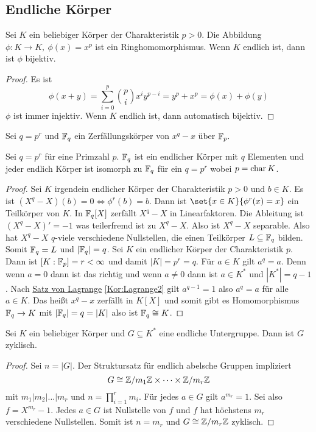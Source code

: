 \subsection{Endliche Körper}
\begin{Lemma}
    Sei $K$ ein beliebiger Körper der Charakteristik $p>0$. Die Abbildung $\phi\colon K\to K,\ \phi(x)=x^p$ ist ein Ringhomomorphismus. Wenn $K$ endlich ist, dann ist $\phi$ bijektiv.
\end{Lemma}
\begin{proof}
    Es ist $$\phi(x+y)=\sum_{i=0}^p\binom{p}{i}x^iy^{p-i}=y^p+x^p=\phi(x)+\phi(y)$$
    $\phi$ ist immer injektiv. Wenn $K$ endlich ist, dann automatisch bijektiv.
\end{proof}
\begin{Def}
    Sei $q=p^r$ und $\mathbb{F}_q$ ein Zerfällungskörper von $x^q-x$ über $\mathbb{F}_p.$
\end{Def}
\begin{Satz} Sei $q=p^r$ für eine Primzahl $p$.
    $\mathbb{F}_q$ ist ein endlicher Körper mit $q$ Elementen und jeder endlich Körper ist isomorph zu $\mathbb{F}_q$ für ein $q=p^r$ wobei $p=\operatorname{char} K$.
\end{Satz}
\begin{proof}
    Sei $K$ irgendein endlicher Körper der Charakteristik $p>0$ und $b\in K$. Es ist $(X^q-X)(b)=0\iff \phi^r(b)=b$. Dann ist $\set{x\in K}{ \phi^r(x)=x}$ ein Teilkörper von $K$.
    In $\mathbb{F}_q[X]$ zerfällt $X^q-X$ in Linearfaktoren. Die Ableitung ist $(X^q-X)'=-1$ was teilerfremd ist zu $X^q-X$. Also ist $X^q-X$ separable. Also hat $X^q-X$ $q$-viele verschiedene Nullstellen, die einen Teilkörper $L\subseteq \mathbb{F}_q$ bilden. Somit $\mathbb{F}_q=L$ und $|\mathbb{F}_q|=q$.
    Sei $K$ ein endlicher Körper der Charakteristik $p$. Dann ist $[K:\mathbb{F}_p]=r<\infty$ und damit $|K|=p^r=q$.
    Für $a\in K$ gilt $a^q=a$. Denn wenn $a=0$ dann ist das richtig und wenn $a\neq 0$ dann ist $a\in K^*$ und $|K^*|=q-1$. Nach \hyperref[Kor:Lagrange2]{ Satz von Lagrange} \ref{Kor:Lagrange2} gilt $a^{q-1}=1$ also $a^q=a$ für alle $a\in K$. Das heißt $x^q-x$ zerfällt in $K[X]$ und somit gibt es Homomorphismus $\mathbb{F}_q\to K$ mit $|\mathbb{F}_q|=q=|K|$ also ist $\mathbb{F}_q\cong K$.
\end{proof}
\begin{Satz}
    Sei $K$ ein beliebiger Körper und $G\subseteq K^*$ eine endliche Untergruppe. Dann ist $G$ zyklisch.
\end{Satz}
\begin{proof}
    Sei $n=|G|$. Der Struktursatz für endlich abelsche Gruppen impliziert 
    $$G\cong \mathbb{Z}/m_1\mathbb{Z}\times \dots\times \mathbb{Z}/m_r\mathbb{Z}$$ mit $m_1|m_2|\dots| m_r$ und $n=\prod_{i=1}^rm_i$.
    Für jedes $a\in G$ gilt $a^{m_r}=1$. Sei also $f=X^{m_r}-1$. Jedes $a\in G$ ist Nullstelle von $f$ und $f$ hat höchstens $m_r$ verschiedene Nullstellen. Somit ist $n=m_r$ und $G\cong \mathbb{Z}/m_r\mathbb{Z}$ zyklisch.

\end{proof}
